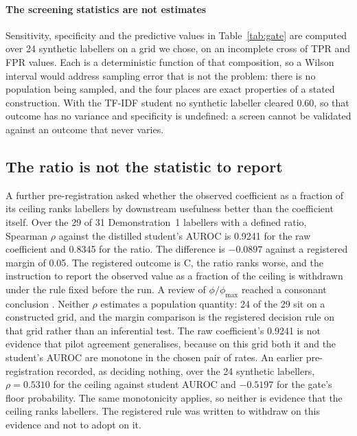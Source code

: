 \documentclass[review]{elsarticle}
\begin{document}
\paragraph{The screening statistics are not estimates}
Sensitivity, specificity and the predictive values in
Table~\ref{tab:gate} are computed over 24 synthetic labellers on a grid we chose,
on an incomplete cross of TPR and FPR values. Each is a deterministic function of that composition, so a Wilson interval
\cite{wilson1927probable} would address sampling error that is not the problem:
there is no population being sampled, and the four places are exact properties
of a stated construction. With the TF-IDF student no synthetic labeller cleared
0.60, so that outcome has no variance and specificity is undefined: a screen
cannot be validated against an outcome that never varies.

\subsection{The ratio is not the statistic to report}
\label{sec:res-ratio}

A further pre-registration asked whether the observed coefficient as a fraction
of its ceiling ranks labellers by downstream usefulness better than the
coefficient itself. Over the 29 of 31 Demonstration~1 labellers with a defined
ratio, Spearman $\rho$ against the distilled student's AUROC is 0.9241 for the
raw coefficient and 0.8345 for the ratio. The difference is $-0.0897$ against a
registered margin of 0.05. The registered outcome is C, the ratio ranks worse,
and the instruction to report the observed value as a fraction of the ceiling
is withdrawn under the rule fixed before the run. A review of
$\phi/\phi_{\max}$ reached a consonant conclusion \cite{davenport1991phiphimax}. Neither $\rho$ estimates a population quantity: 24 of the 29 sit on a
constructed grid, and the margin comparison is the registered decision rule on
that grid rather than an inferential test. The raw coefficient's 0.9241 is not evidence that pilot
agreement generalises, because on this grid both it and the student's AUROC are
monotone in the chosen pair of rates. An earlier pre-registration recorded, as
deciding nothing, over the 24 synthetic labellers, $\rho = 0.5310$ for the
ceiling against student AUROC and $-0.5197$ for the gate's floor probability. The
same monotonicity applies, so neither is evidence that the ceiling ranks
labellers. The registered rule was written to withdraw on this
evidence and not to adopt on it.
\end{document}
